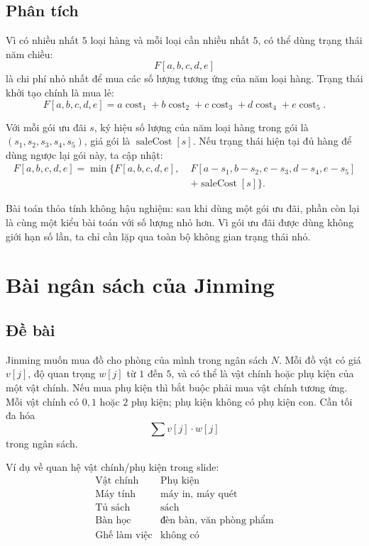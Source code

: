 \documentclass[11pt]{article}
\begin{document}
\subsection{Phân tích}

Vì có nhiều nhất \(5\) loại hàng và mỗi loại cần nhiều nhất \(5\), có thể dùng
trạng thái năm chiều:
\[
  F[a,b,c,d,e]
\]
là chi phí nhỏ nhất để mua các số lượng tương ứng của năm loại hàng. Trạng
thái khởi tạo chính là mua lẻ:
\[
  F[a,b,c,d,e]=
  a\operatorname{cost}_1+b\operatorname{cost}_2+
  c\operatorname{cost}_3+d\operatorname{cost}_4+e\operatorname{cost}_5.
\]

Với mỗi gói ưu đãi \(s\), ký hiệu số lượng của năm loại hàng trong gói là
\((s_1,s_2,s_3,s_4,s_5)\), giá gói là \(\operatorname{saleCost}[s]\). Nếu
trạng thái hiện tại đủ hàng để dùng ngược lại gói này, ta cập nhật:
\[
\begin{aligned}
F[a,b,c,d,e]=\min\{F[a,b,c,d,e],\;&
F[a-s_1,b-s_2,c-s_3,d-s_4,e-s_5]\\
&+\operatorname{saleCost}[s]\}.
\end{aligned}
\]

Bài toán thỏa tính không hậu nghiệm: sau khi dùng một gói ưu đãi, phần còn lại
là cùng một kiểu bài toán với số lượng nhỏ hơn. Vì gói ưu đãi được dùng không
giới hạn số lần, ta chỉ cần lặp qua toàn bộ không gian trạng thái nhỏ.

\section{Bài ngân sách của Jinming}

\subsection{Đề bài}

Jinming muốn mua đồ cho phòng của mình trong ngân sách \(N\). Mỗi đồ vật có
giá \(v[j]\), độ quan trọng \(w[j]\) từ \(1\) đến \(5\), và có thể là vật
chính hoặc phụ kiện của một vật chính. Nếu mua phụ kiện thì bắt buộc phải mua
vật chính tương ứng. Mỗi vật chính có \(0,1\) hoặc \(2\) phụ kiện; phụ kiện
không có phụ kiện con. Cần tối đa hóa
\[
  \sum v[j]\cdot w[j]
\]
trong ngân sách.

Ví dụ về quan hệ vật chính/phụ kiện trong slide:
\[
\begin{array}{c|l}
\text{Vật chính} & \text{Phụ kiện}\\ \hline
\text{Máy tính} & \text{máy in, máy quét}\\
\text{Tủ sách} & \text{sách}\\
\text{Bàn học} & \text{đèn bàn, văn phòng phẩm}\\
\text{Ghế làm việc} & \text{không có}
\end{array}
\]
\end{document}
